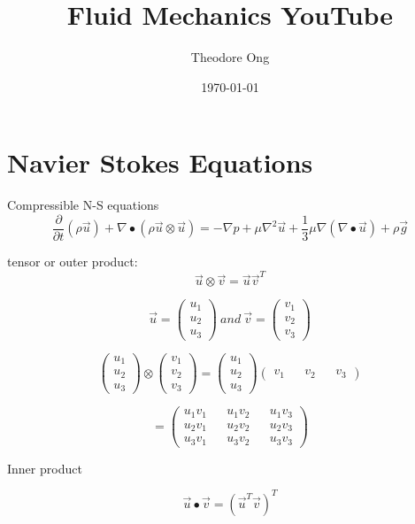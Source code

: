 \documentclass[11pt]{article}
\begin{document}
\title{Fluid Mechanics YouTube}
\author{Theodore Ong}
\date{\today}
\maketitle


\part{Navier Stokes Equations}

Compressible N-S equations
$$\frac{\partial}{\partial t}(\rho \vec{u}) + \nabla \bullet (\rho \vec{u} \otimes \vec{u})  = - \nabla p + \mu \nabla^2 \vec{u} + \frac{1}{3} \mu \nabla (\nabla \bullet \vec{u}) + \rho \vec{g}$$


tensor or outer product:
$$\vec{u} \otimes \vec{v} = \vec{u}\vec{v}^T$$

$$\vec{u}=\begin{pmatrix}
u_1 \\
u_2 \\
u_3 
\end{pmatrix} \ and\ 
\vec{v} = \begin{pmatrix}
v_1 \\
v_2 \\
v_3
\end{pmatrix}
$$


$$ \begin{pmatrix}
u_1 \\
u_2 \\
u_3 
\end{pmatrix} \otimes \begin{pmatrix}
v_1 \\
v_2 \\
v_3 
\end{pmatrix} = \begin{pmatrix}
u_1 \\
u_2 \\
u_3 
\end{pmatrix} \begin{pmatrix}
v_1 && v_2 && v_3
\end{pmatrix}
$$

$$= \begin{pmatrix}
u_1 v_1  && u_1 v_2 && u_1 v_3 \\
u_2  v_1 && u_2 v_2 && u_2 v_3 \\
u_3 v_1 && u_3 v_2 && u_3 v_3
\end{pmatrix}
$$

Inner product

$$\vec{u} \bullet \vec{v} = (\vec{u}^T \vec{v})^T$$
\end{document}
